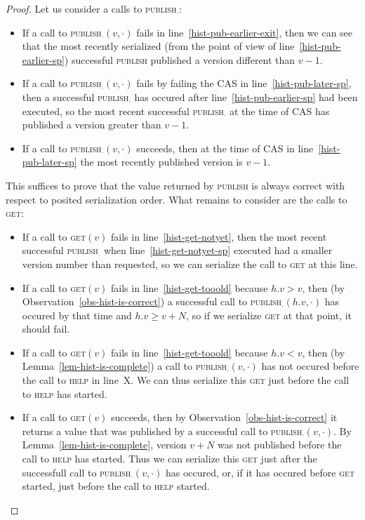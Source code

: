 \documentclass[a4paper,11pt]{article}
\newcommand{\fn}[1]{\textsc{#1}}
\begin{document}
\begin{proof}
Let us consider a calls to \fn{publish$_\cdot$}:
\begin{itemize}
\item If a call to \fn{publish$_\cdot$}$(v, \cdot)$ fails in line~\ref{hist-pub-earlier-exit}, then we can see that the most recently serialized (from the point of view of line~\ref{hist-pub-earlier-sp}) successful \fn{publish} published a version different than $v-1$.
\item If a call to \fn{publish$_\cdot$}$(v, \cdot)$ fails by failing the CAS in line~\ref{hist-pub-later-sp}, then a successful \fn{publish$_\cdot$} has occured after line~\ref{hist-pub-earlier-sp} had been executed, so the most recent successful \fn{publish$_\cdot$} at the time of \fn{CAS} has published a version greater than $v-1$.
\item If a call to \fn{publish$_\cdot$}$(v, \cdot)$ succeeds, then at the time of CAS in line~\ref{hist-pub-later-sp} the most recently published version is $v-1$.
	\end{itemize}
	This suffices to prove that the value returned by \fn{publish} is always correct with respect to posited
	serialization order. What remains to consider are the calls to \fn{get}:
\begin{itemize}
	\item If a call to \fn{get}$(v)$ fails in line~\ref{hist-get-notyet}, then the most recent successful \fn{publish$_\cdot$} when line~\ref{hist-get-notyet-sp} executed had a smaller version number than requested, so we can serialize the call to \fn{get} at this line.
	\item If a call to \fn{get}$(v)$ fails in line~\ref{hist-get-tooold} because $h.v > v$, then (by Observation~\ref{obs-hist-is-correct}) a successful call to \fn{publish$_\cdot$}$(h.v, \cdot)$ has occured by that time and $h.v \geq v+N$, so if we serialize \fn{get} at that point, it should fail.
	\item If a call to \fn{get}$(v)$ fails in line~\ref{hist-get-tooold} because $h.v < v$, then (by Lemma~\ref{lem-hist-is-complete}) a call to \fn{publish$_\cdot$}$(v, \cdot)$ has not occured before the call to \fn{help} in line~X. We can thus serialize this \fn{get} just before the call to \fn{help} has started.
	\item If a call to \fn{get}$(v)$ succeeds, then by Observation~\ref{obs-hist-is-correct} it returns a value that was published by a successful call to \fn{publish$_\cdot$}$(v, \cdot)$. By Lemma~\ref{lem-hist-is-complete}, version $v+N$ was not published before the call to \fn{help} has started. Thus we can serialize this \fn{get} just after the successfull call to \fn{publish$_\cdot$}$(v, \cdot)$ has occured, or, if it has occured before \fn{get} started, just before the call to \fn{help} started.
\end{itemize}
\end{proof}
\end{document}

